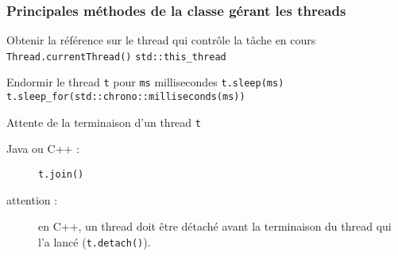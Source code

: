 
\begingroup

\begin{frame}[fragile]
  \frametitle{Principales méthodes de la classe gérant les threads}

  \vfill
\begin{block}{Obtenir la référence sur le thread qui contrôle la tâche en cours}
    \lstinline|Thread.currentThread()| \hfill
    \lstinline|std::this_thread|
\end{block}
\pause
  \vfill
  \vfill
\begin{block}{Endormir le thread \lstinline{t} pour \lstinline{ms} millisecondes}
    \lstinline|t.sleep(ms)| \hfill
    \lstinline|t.sleep_for(std::chrono::milliseconds(ms))|
 \end{block}
  \vfill
  \vfill
\pause
\begin{block}{Attente de la terminaison d'un thread \lstinline{t}}
 \begin{description}
 \item[Java ou C++ :] \lstinline|t.join()|
  \item [\alert{ attention :}] en C++, un thread doit être détaché avant la terminaison du thread qui l'a lancé (\lstinline|t.detach()|). 
 \end{description}
\end{block}
  \vfill
\end{frame}

\endgroup
\endinput
